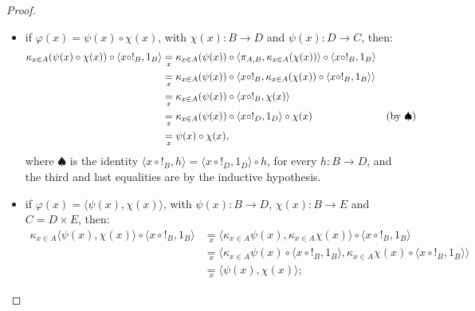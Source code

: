 \begin{proof}
\begin{itemize}
\begin{itemize}
\begin{align*}
            \end{align*}
            \item if $\varphi(x) = \psi(x) \circ \chi(x)$, with $\chi(x) : B \to D$ and $\psi(x) : D \to C$, then:
            \begin{align*}
                \kappa_{x \in A}(\psi(x) \circ \chi(x)) \circ \langle x \circ !_B, 1_B\rangle &\underset{x}{=} \kappa_{x \in A}(\psi(x)) \circ \langle \pi_{A,B}, \kappa_{x \in A}(\chi(x))\rangle \circ \langle x \circ !_B, 1_B\rangle \\
                                                                                              &\underset{x}{=} \kappa_{x \in A}(\psi(x)) \circ \langle x \circ !_B, \kappa_{x \in A}(\chi(x)) \circ \langle x \circ !_B, 1_B\rangle \rangle \\
                                                                                              &\underset{x}{=} \kappa_{x \in A}(\psi(x)) \circ \langle x \circ !_B, \chi(x)\rangle \\
                                                                                              &\underset{x}{=} \kappa_{x \in A}(\psi(x)) \circ \langle x \circ !_D, 1_D\rangle \circ \chi(x) &&(\textnormal{by $\spadesuit$})\\
                                                                                              &\underset{x}{=} \psi(x) \circ \chi(x),
            \end{align*}
            where $\spadesuit$ is the identity $\langle x \circ !_B, h \rangle = \langle x \circ !_D, 1_D\rangle \circ h$, for every $h : B \to D$, and the third and last equalities are by the inductive hypothesis.
            \item if $\varphi(x) = \langle \psi(x), \chi(x)\rangle$, with $\psi(x) : B \to D$, $\chi(x) : B \to E$ and $C = D \times E$, then:
            \begin{align*}
                \kappa_{x \in A}\langle \psi(x), \chi(x)\rangle \circ \langle x \circ !_B, 1_B\rangle &\underset{x}{=} \langle \kappa_{x \in A}\psi(x), \kappa_{x \in A}\chi(x)\rangle \circ \langle x \circ !_B, 1_B\rangle \\
                                                                                                      &\underset{x}{=} \langle \kappa_{x \in A}\psi(x) \circ \langle x \circ !_B, 1_B\rangle, \kappa_{x \in A}\chi(x) \circ \langle x \circ !_B, 1_B\rangle\rangle \\
                                                                                                      &\underset{x}{=} \langle \psi(x),\chi(x)\rangle;

\end{align*}
\end{itemize}
\end{itemize}
\end{proof}
